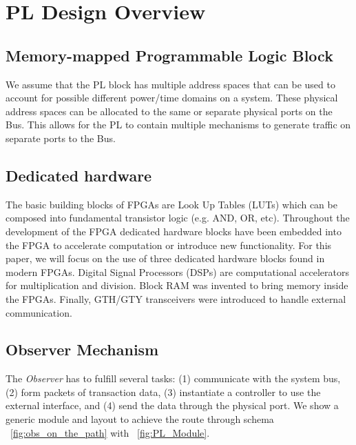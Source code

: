 \section{PL Design Overview}
\subsection{Memory-mapped Programmable Logic Block}
We assume that the PL block has multiple address spaces that can be used to account for possible different power/time domains on a system. These physical address spaces can be allocated to the same or separate physical ports on the Bus. This allows for the PL to contain multiple mechanisms to generate traffic on separate ports to the Bus.
\subsection{Dedicated hardware}
The basic building blocks of FPGAs are Look Up Tables (LUTs) which can be composed into fundamental transistor logic (e.g. AND, OR, etc). Throughout the development of the FPGA dedicated hardware blocks have been embedded into the FPGA to accelerate computation or introduce new functionality. For this paper, we will focus on the use of three dedicated hardware blocks found in modern FPGAs. Digital Signal Processors (DSPs) are computational accelerators for multiplication and division. Block RAM was invented to bring memory inside the FPGAs. Finally, GTH/GTY transceivers were introduced to handle external communication. 

\subsection{Observer Mechanism}
The \emph{Observer} has to fulfill several tasks: (1) communicate with the system bus, (2) form packets of transaction data, (3) instantiate a controller to use the external interface, and (4) send the data through the physical port. We show a generic module and layout to achieve the route through schema ~\ref{fig:obs_on_the_path} with ~\ref{fig:PL_Module}. 


